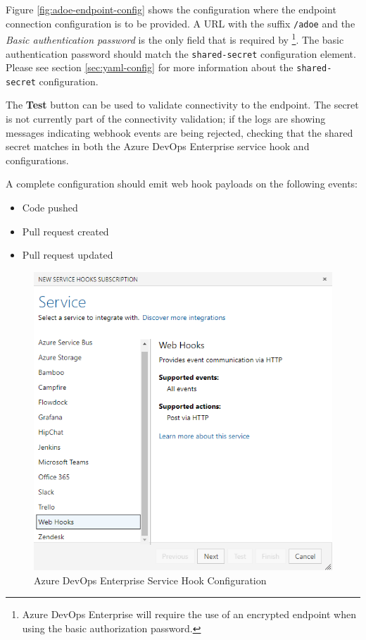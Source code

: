 Figure \ref{fig:adoe-endpoint-config} shows the configuration where the \cxoneflow
endpoint connection configuration is to be provided.  A URL with the suffix
\texttt{/adoe} and the \textit{Basic authentication password} is the only
field that is required by \cxoneflow\footnote{Azure DevOps Enterprise will require
the use of an encrypted endpoint when using the basic authorization password.}.
The basic authentication password should match the \texttt{shared-secret} \cxoneflow
configuration element.  Please see section \ref{sec:yaml-config}
for more information about the \texttt{shared-secret} configuration.

The \textbf{Test} button can be used to validate connectivity to the \cxoneflow endpoint.
The secret is not currently part of the connectivity validation; if the \cxoneflow logs
are showing messages indicating webhook events are being rejected, checking that the
shared secret matches in both the Azure DevOps Enterprise service hook and \cxoneflow
configurations.

A complete configuration should emit web hook payloads on the following events:

\begin{itemize}
    \item Code pushed
    \item Pull request created
    \item Pull request updated
\end{itemize}

\begin{figure}[ht]
    \includegraphics[width=\textwidth]{graphics/adoe-service-hooks-sub.png}
    \caption{Azure DevOps Enterprise Service Hook Configuration}
    \label{fig:adoe-hook-config}
\end{figure}

